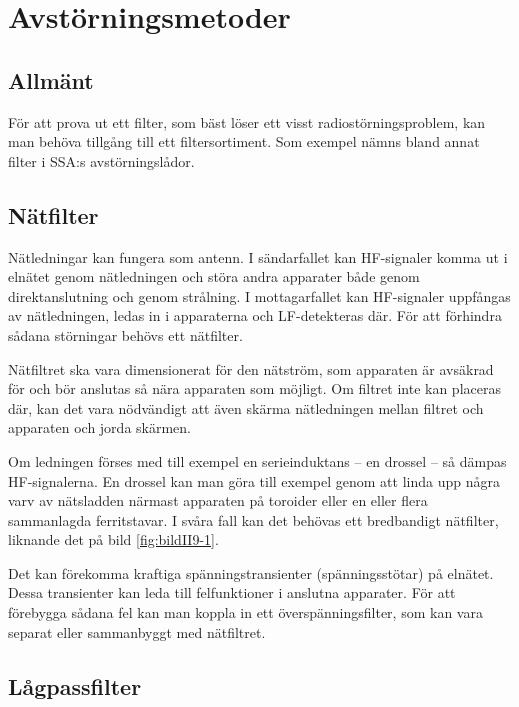 \section{Avstörningsmetoder}
\label{avstörning}

\subsection{Allmänt}
För att prova ut ett filter, som bäst löser ett visst radiostörningsproblem,
kan man behöva tillgång till ett filtersortiment.
Som exempel nämns bland annat filter i SSA:s avstörningslådor.

\subsection{Nätfilter}

Nätledningar kan fungera som antenn.
I sändarfallet kan HF-signaler komma ut i elnätet genom nätledningen och störa
andra apparater både genom direktanslutning och genom strålning.
I mottagarfallet kan HF-signaler uppfångas av nätledningen, ledas in i
apparaterna och LF-detekteras där.
För att förhindra sådana störningar behövs ett nätfilter.

Nätfiltret ska vara dimensionerat för den nätström, som apparaten är avsäkrad
för och bör anslutas så nära apparaten som möjligt.
Om filtret inte kan placeras där, kan det vara nödvändigt att även skärma
nätledningen mellan filtret och apparaten och jorda skärmen.


Om ledningen förses med till exempel en serieinduktans -- en drossel -- så dämpas
HF-signalerna.
En drossel kan man göra till exempel genom att linda upp några varv av nätsladden
närmast apparaten på toroider eller en eller flera sammanlagda ferritstavar.
I svåra fall kan det behövas ett bredbandigt nätfilter, liknande
det på bild \ref{fig:bildII9-1}.

Det kan förekomma kraftiga spänningstransienter (spänningsstötar) på elnätet.
Dessa transienter kan leda till felfunktioner i anslutna apparater.
För att förebygga sådana fel kan man koppla in ett överspänningsfilter, som kan
vara separat eller sammanbyggt med nätfiltret.

\subsection{Lågpassfilter}
\label{Lågpassfilter}

